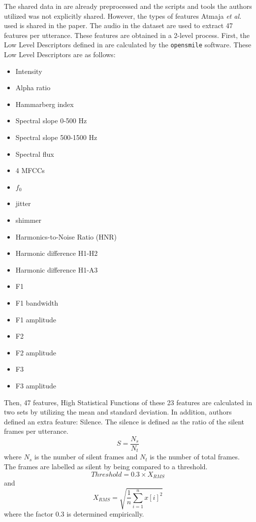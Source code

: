 \documentclass[a4paper,11pt]{article}
\begin{document}
The shared data in \cite{atmaja2020deep} are already preprocessed and the scripts and tools the authors utilized was not explicitly shared. However, the types of features Atmaja \textit{et al.} used is shared in the paper.  
The audio in the dataset are used to extract 47 features per utterance.
These features are obtained in a 2-level process. First, the Low Level Descriptors defined in \cite{eyben2010opensmile} are calculated by the \texttt{opensmile} software. These Low Level Descriptors are as follows: 
\begin{multicols}{3}
\begin{itemize}
    \item Intensity
    \item Alpha ratio
    \item Hammarberg index
    \item Spectral slope 0-500 Hz
    \item Spectral slope 500-1500 Hz
    \item Spectral flux
    \item 4 MFCCs
    \item $f_0$
    \item jitter
    \item shimmer
    \item Harmonics-to-Noise Ratio (HNR)
    \item Harmonic difference H1-H2
    \item Harmonic difference H1-A3
    \item F1
    \item F1 bandwidth
    \item F1 amplitude
    \item F2
    \item F2 amplitude
    \item F3 
    \item F3 amplitude
\end{itemize}
\end{multicols}

Then, 47 features, High Statistical Functions of these 23 features are calculated in two sets by utilizing the mean and standard deviation. In addition, authors defined an extra feature: Silence. The silence is defined as the ratio of the silent frames per utterance. 
\begin{equation}
    S = \frac{N_s}{N_t}
\end{equation}
where $N_s$ is the number of silent frames and $N_t$ is the number of total frames.
The frames are labelled as silent by being compared to a threshold. 
\begin{equation}
    Threshold = 0.3 \times X_{RMS}
\end{equation} 
and 
\begin{equation}
    X_{RMS} = \sqrt{\frac{1}{n}\sum_{i=1}^n{x[i]}^2}
\end{equation} 
where the factor 0.3 is determined empirically.
\end{document}
